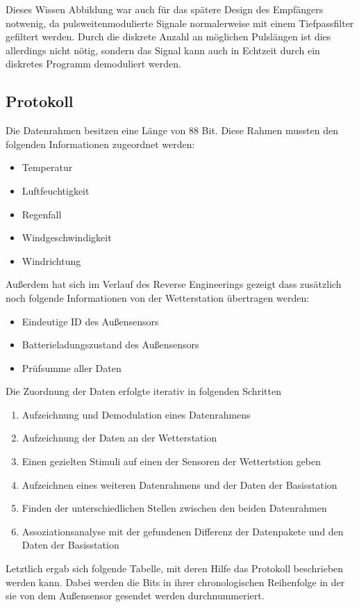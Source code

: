 \documentclass{report}
\begin{document}
Dieses Wissen Abbildung war auch für das spätere Design des Empfängers notwenig, da pulsweitenmodulierte Signale normalerweise mit einem Tiefpassfilter gefiltert werden. Durch die diskrete Anzahl an möglichen Pulslängen ist dies allerdings nicht nötig, sondern das Signal kann auch in Echtzeit durch ein diskretes Programm demoduliert werden.


\subsection{Protokoll}
Die Datenrahmen besitzen eine Länge von 88 Bit. Diese Rahmen mussten den folgenden Informationen zugeordnet werden:

\begin{itemize}
    \item Temperatur
    \item Luftfeuchtigkeit
    \item Regenfall
    \item Windgeschwindigkeit
    \item Windrichtung
\end{itemize}
Außerdem hat sich im Verlauf des Reverse Engineerings gezeigt dass zusätzlich noch folgende Informationen von der Wetterstation übertragen werden:
\begin{itemize}
    \item Eindeutige ID des Au\ss ensensors
    \item Batterieladungszustand des Au\ss ensensors
    \item Prüfsumme aller Daten
\end{itemize}
Die Zuordnung der Daten erfolgte iterativ in folgenden Schritten
\begin{enumerate}
    \item Aufzeichnung und Demodulation eines Datenrahmens
    \item Aufzeichnung der Daten an der Wetterstation
    \item Einen gezielten Stimuli auf einen der Sensoren der Wettertstion geben
    \item Aufzeichnen eines weiteren Datenrahmens und der Daten der Basisstation
    \item Finden der unterschiedlichen Stellen zwischen den beiden Datenrahmen
    \item Assoziationsanalyse mit der gefundenen Differenz der Datenpakete und den Daten der Basisstation
\end{enumerate}
Letztlich ergab sich folgende Tabelle, mit deren Hilfe das Protokoll beschrieben werden kann. Dabei werden die Bits in ihrer chronologischen Reihenfolge in der sie von dem Au\ss ensensor gesendet werden durchnummeriert.
\end{document}
